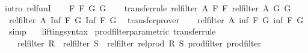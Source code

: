 \begin{isabellebody}
%
\isadelimproof
%
\endisadelimproof
%
\isatagproof
{}\isamarkupfalse%
{\isacharparenleft}{\kern0pt}intro\ rel{\isacharunderscore}{\kern0pt}funI{\isacharparenright}{\kern0pt}{\isacharplus}{\kern0pt}\isanewline
\ \ \isamarkupfalse%
\ F\ F{\isacharprime}{\kern0pt}\ G\ G{\isacharprime}{\kern0pt}\isanewline
\ \ \isamarkupfalse%
\ {\isacharbrackleft}{\kern0pt}transfer{\isacharunderscore}{\kern0pt}rule{\isacharbrackright}{\kern0pt}{\isacharcolon}{\kern0pt}\ {\isachardoublequoteopen}rel{\isacharunderscore}{\kern0pt}filter\ A\ F\ F{\isacharprime}{\kern0pt}{\isachardoublequoteclose}\ {\isachardoublequoteopen}rel{\isacharunderscore}{\kern0pt}filter\ A\ G\ G{\isacharprime}{\kern0pt}{\isachardoublequoteclose}\isanewline
\ \ \isamarkupfalse%
\ {\isachardoublequoteopen}rel{\isacharunderscore}{\kern0pt}filter\ A\ {\isacharparenleft}{\kern0pt}Inf\ {\isacharbraceleft}{\kern0pt}F{\isacharcomma}{\kern0pt}\ G{\isacharbraceright}{\kern0pt}{\isacharparenright}{\kern0pt}\ {\isacharparenleft}{\kern0pt}Inf\ {\isacharbraceleft}{\kern0pt}F{\isacharprime}{\kern0pt}{\isacharcomma}{\kern0pt}\ G{\isacharprime}{\kern0pt}{\isacharbraceright}{\kern0pt}{\isacharparenright}{\kern0pt}{\isachardoublequoteclose}\ \isamarkupfalse%
\ transfer{\isacharunderscore}{\kern0pt}prover\isanewline
\ \ \isamarkupfalse%
\ {\isachardoublequoteopen}rel{\isacharunderscore}{\kern0pt}filter\ A\ {\isacharparenleft}{\kern0pt}inf\ F\ G{\isacharparenright}{\kern0pt}\ {\isacharparenleft}{\kern0pt}inf\ F{\isacharprime}{\kern0pt}\ G{\isacharprime}{\kern0pt}{\isacharparenright}{\kern0pt}{\isachardoublequoteclose}\ \isamarkupfalse%
\ simp\isanewline
{}\isamarkupfalse%
%
\endisatagproof
{\isafoldproof}%
%
\isadelimproof
\isanewline
%
\endisadelimproof
\isanewline
{}\isamarkupfalse%
\isanewline
\isanewline
{}\isamarkupfalse%
\isanewline
\isanewline
{}\isamarkupfalse%
\isanewline
\isanewline
{}\isamarkupfalse%
\isanewline
\ \ \ lifting{\isacharunderscore}{\kern0pt}syntax\isanewline
{}\isanewline
\isanewline
{}\isamarkupfalse%
\ prod{\isacharunderscore}{\kern0pt}filter{\isacharunderscore}{\kern0pt}parametric\ {\isacharbrackleft}{\kern0pt}transfer{\isacharunderscore}{\kern0pt}rule{\isacharbrackright}{\kern0pt}{\isacharcolon}{\kern0pt}\isanewline
\ \ \ {\isachardoublequoteopen}{\isacharparenleft}{\kern0pt}rel{\isacharunderscore}{\kern0pt}filter\ R\ {\isacharequal}{\kern0pt}{\isacharequal}{\kern0pt}{\isacharequal}{\kern0pt}{\isachargreater}{\kern0pt}\ rel{\isacharunderscore}{\kern0pt}filter\ S\ {\isacharequal}{\kern0pt}{\isacharequal}{\kern0pt}{\isacharequal}{\kern0pt}{\isachargreater}{\kern0pt}\ rel{\isacharunderscore}{\kern0pt}filter\ {\isacharparenleft}{\kern0pt}rel{\isacharunderscore}{\kern0pt}prod\ R\ S{\isacharparenright}{\kern0pt}{\isacharparenright}{\kern0pt}\ prod{\isacharunderscore}{\kern0pt}filter\ prod{\isacharunderscore}{\kern0pt}filter{\isachardoublequoteclose}\isanewline

\end{isabellebody}
